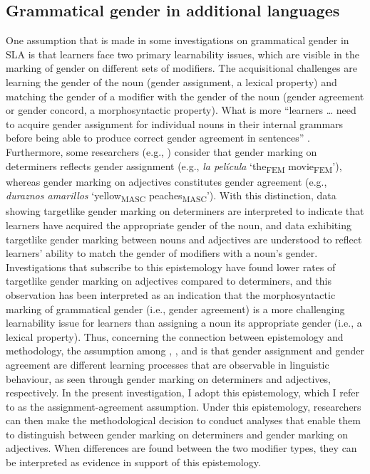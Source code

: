 \documentclass[output=paper,colorlinks,citecolor=brown,modfonts,nonflat]{../langscibook}
\begin{document}
\subsection{Grammatical gender in additional languages}\label{sec:gudmestad:2.2}

One assumption that is made in some investigations on grammatical gender in SLA is that learners face two primary learnability issues, which are visible in the marking of gender on different sets of modifiers. The acquisitional challenges are learning the gender of the noun (gender assignment, a lexical property) and matching the gender of a modifier with the gender of the noun (gender agreement or gender concord, a morphosyntactic property). What is more “learners … need to acquire gender assignment for individual nouns in their internal grammars before being able to produce correct gender agreement in sentences” \citep[268]{Alarcón2010}. Furthermore, some researchers (e.g., \citealt{Ayoun2007,Alarcón2010,KupischEtAl2013}) consider that gender marking on determiners reflects gender assignment (e.g., \textit{la película} ‘the\textsubscript{FEM} movie\textsubscript{FEM}’), whereas gender marking on adjectives constitutes gender agreement (e.g., \textit{duraznos amarillos} ‘yellow\textsubscript{MASC} peaches\textsubscript{MASC}’). With this distinction, data showing targetlike gender marking on determiners are interpreted to indicate that learners have acquired the appropriate gender of the noun, and data exhibiting targetlike gender marking between nouns and adjectives are understood to reflect learners’ ability to match the gender of modifiers with a noun’s gender. Investigations that subscribe to this epistemology have found lower rates of targetlike gender marking on adjectives compared to determiners, and this observation has been interpreted as an indication that the morphosyntactic marking of grammatical gender (i.e., gender agreement) is a more challenging learnability issue for learners than assigning a noun its appropriate gender (i.e., a lexical property). Thus, concerning the connection between epistemology and methodology, the assumption among \citeauthor{Ayoun2007}, \citeauthor{Alarcón2010}, and \citeauthor{KupischEtAl2013} is that gender assignment and gender agreement are different learning processes that are observable in linguistic behaviour, as seen through gender marking on determiners and adjectives, respectively. In the present investigation, I adopt this epistemology, which I refer to as the assignment-agreement assumption. Under this epistemology, researchers can then make the methodological decision to conduct analyses that enable them to distinguish between gender marking on determiners and gender marking on adjectives. When differences are found between the two modifier types, they can be interpreted as evidence in support of this epistemology.
\end{document}

